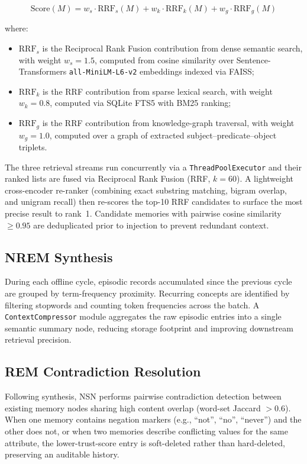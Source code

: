 \documentclass[conference]{IEEEtran}
\begin{document}
\begin{equation}
\text{Score}(M) = w_s \cdot \text{RRF}_s(M) + w_k \cdot \text{RRF}_k(M) + w_g \cdot \text{RRF}_g(M)
\label{eq:score}
\end{equation}

where:
\begin{itemize}
    \item $\text{RRF}_s$ is the Reciprocal Rank Fusion contribution from dense semantic search, with weight $w_s = 1.5$, computed from cosine similarity over Sentence-Transformers \texttt{all-MiniLM-L6-v2} embeddings indexed via FAISS;
    \item $\text{RRF}_k$ is the RRF contribution from sparse lexical search, with weight $w_k = 0.8$, computed via SQLite FTS5 with BM25 ranking;
    \item $\text{RRF}_g$ is the RRF contribution from knowledge-graph traversal, with weight $w_g = 1.0$, computed over a graph of extracted subject--predicate--object triplets.
\end{itemize}

The three retrieval streams run concurrently via a \texttt{ThreadPoolExecutor} and their ranked lists are fused via Reciprocal Rank Fusion (RRF, $k=60$). A lightweight cross-encoder re-ranker (combining exact substring matching, bigram overlap, and unigram recall) then re-scores the top-10 RRF candidates to surface the most precise result to rank~1. Candidate memories with pairwise cosine similarity $\geq 0.95$ are deduplicated prior to injection to prevent redundant context.

\subsection{NREM Synthesis}
During each offline cycle, episodic records accumulated since the previous cycle are grouped by term-frequency proximity. Recurring concepts are identified by filtering stopwords and counting token frequencies across the batch. A \texttt{ContextCompressor} module aggregates the raw episodic entries into a single semantic summary node, reducing storage footprint and improving downstream retrieval precision.

\subsection{REM Contradiction Resolution}
Following synthesis, NSN performs pairwise contradiction detection between existing memory nodes sharing high content overlap (word-set Jaccard $> 0.6$). When one memory contains negation markers (e.g., ``not'', ``no'', ``never'') and the other does not, or when two memories describe conflicting values for the same attribute, the lower-trust-score entry is soft-deleted rather than hard-deleted, preserving an auditable history.
\end{document}
